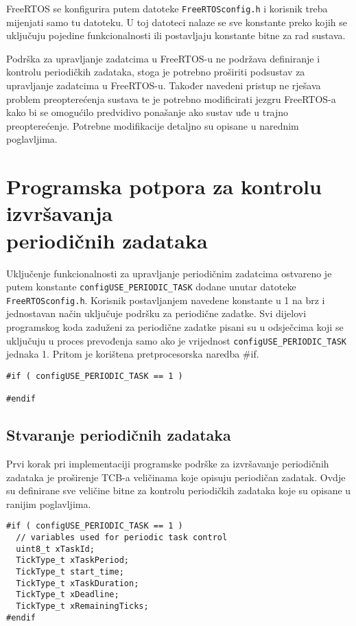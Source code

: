 \documentclass[../zavrsni.tex]{subfiles}
\begin{document}
FreeRTOS se konfigurira putem datoteke \texttt{FreeRTOSconfig.h} i korisnik treba mijenjati samo tu datoteku. U toj datoteci nalaze se 
sve konstante preko kojih se uključuju pojedine funkcionalnosti ili postavljaju konstante bitne za rad sustava.  

Podrška za upravljanje zadatcima u FreeRTOS-u ne podržava definiranje i kontrolu periodičkih zadataka, stoga je potrebno proširiti podsustav 
za upravljanje zadatcima u FreeRTOS-u.
Također navedeni pristup ne rješava problem preopterećenja sustava te je potrebno modificirati jezgru FreeRTOS-a kako bi se omogućilo 
predvidivo ponašanje ako sustav uđe u trajno preopterećenje. Potrebne modifikacije detaljno su opisane u narednim poglavljima.

\section{Programska potpora za kontrolu izvršavanja \\periodičnih zadataka}

Uključenje funkcionalnosti za upravljanje periodičnim zadatcima ostvareno je putem konstante \texttt{configUSE\_PERIODIC\_TASK} dodane unutar 
datoteke \texttt{FreeRTOSconfig.h}. Korisnik postavljanjem navedene konstante u 1 na brz i jednostavan način uključuje podršku za periodične zadatke.
Svi dijelovi programskog koda zaduženi za periodične zadatke pisani su u odsječcima koji se uključuju u proces prevođenja samo ako je vrijednost 
\texttt{configUSE\_PERIODIC\_TASK} jednaka 1. Pritom je korištena pretprocesorska naredba \#if. 
\begin{lstlisting}[style=CStyle,caption={Pretprocesorska naredba za uključenje periodičnih zadataka},captionpos=b]
#if ( configUSE_PERIODIC_TASK == 1 )

#endif
\end{lstlisting}

\subsection{Stvaranje periodičnih zadataka}

Prvi korak pri implementaciji programske podrške za izvršavanje periodičnih zadataka je proširenje TCB-a veličinama koje opisuju 
periodičan zadatak. Ovdje su definirane sve veličine bitne za kontrolu periodičkih zadataka koje su opisane u ranijim poglavljima.

\begin{lstlisting}[style=CStyle,caption={Varijable dodane u strukturu za kontrolu zadataka},captionpos=b]
#if ( configUSE_PERIODIC_TASK == 1 )
  // variables used for periodic task control    
  uint8_t xTaskId;
  TickType_t xTaskPeriod;
  TickType_t start_time;
  TickType_t xTaskDuration;
  TickType_t xDeadline;
  TickType_t xRemainingTicks;
#endif
\end{lstlisting}
\end{document}
